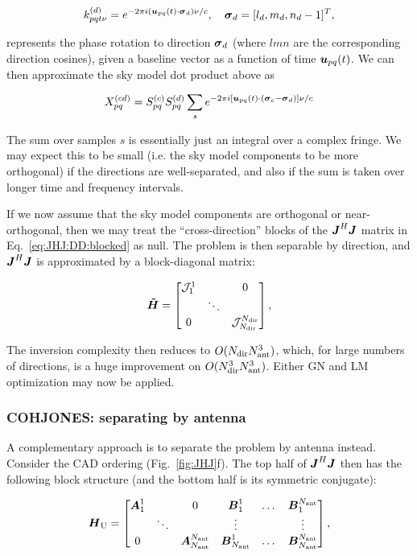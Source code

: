 \documentclass[useAMS,usenatbib]{mn2e}
\makeatletter
\newcommand{\mat}[1]{{\bmath{#1}}}
\newcommand{\JJ}{\mat{J}} %
\newcommand{\HH}{\mat{H}} %
\newcommand{\HHa}{\mat{\tilde{H}}} %
\newcommand{\JHJ}{\JJ^H\JJ} %
\newcommand{\Matrix}[2]{\left [ \begin{array}{@{}#1@{}}#2\end{array} \right ]}
\newcommand{\TOP}{\mathrm{U}}%
\makeatother
\begin{document}
\[
k^{(d)}_{pqt\nu} = e^{-2\pi i (\bmath{u}_{pq}(t)\cdot\bmath{\sigma}_d)\nu/c},~~~\bmath{\sigma}_d = [l_d,m_d,n_d-1]^T,
\]

represents the phase rotation to direction $\bmath{\sigma}_d$ (where $lmn$ are the corresponding direction cosines), 
given a baseline vector as a function of time $\bmath{u}_{pq}(t)$. We can then approximate the sky model dot product above as

\[
X_{pq}^{(cd)} = S^{(c)}_{pq}S^{(d)}_{pq} \sum_s e^{-2\pi i [\bmath{u}_{pq}(t)\cdot(\bmath{\sigma}_c-\bmath{\sigma}_d) ]\nu/c}
\]

The sum over samples $s$ is essentially just an integral over a complex fringe. We may expect this to be small (i.e. the
sky model components to be more orthogonal) if the directions are well-separated, and also if the sum is taken 
over longer time and frequency intervals. 

If we now assume that the sky model components are orthogonal or near-orthogonal, then 
we may treat the ``cross-direction'' blocks of the $\JHJ$ matrix in Eq.~\ref{eq:JHJ:DD:blocked} as null. The problem is 
then separable by direction, and $\JHJ$ is approximated by a block-diagonal matrix:


\begin{equation}
\label{eq:JHJ:DD:block-diag}
\HHa = \Matrix{ccc}{\JJJ^1_1 &  & 0 \\
& \ddots &  \\
0 & & \JJJ_{\Nd}^{\Nd} },
\end{equation}

The inversion complexity then reduces to $O(N_\mathrm{dir}N_\mathrm{ant}^3)$, which, for large numbers of directions, is a huge improvement on 
$O(N_\mathrm{dir}^3N_\mathrm{ant}^3)$. Either GN and LM optimization may now be applied. 



\subsubsection{COHJONES: separating by antenna}

A complementary approach is to separate the problem by antenna instead. Consider the CAD ordering (Fig.~\ref{fig:JHJ}f). 
The top half of $\JHJ$ then has the following block structure (and the bottom half is its symmetric conjugate):

\newcommand{\JJX}{\bmath{A}}
\newcommand{\JJY}{\bmath{B}}

\begin{equation}
\label{eq:JHJ:DD:blocked-ant}
\HH_\TOP = \Matrix{cccccc}{\JJX^1_1 &  & 0 & \JJY^1_1 & \dots & \JJY^{\Na}_1 \\
 & \ddots &  & \vdots & & \vdots \\
0 &  & \JJX_{\Na}^{\Na} & \JJY_{\Na}^1 & \dots & \JJY_{\Na}^{\Na} },
\end{equation}
\end{document}
